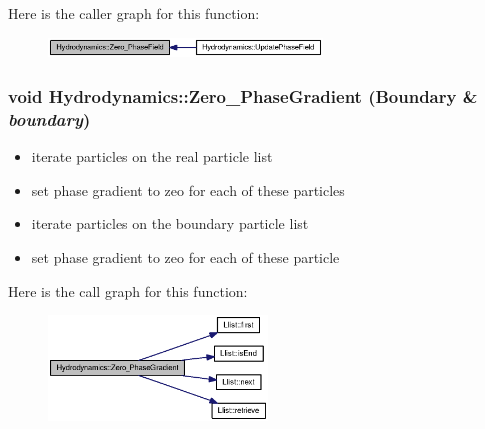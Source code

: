 Here is the caller graph for this function:\nopagebreak
\begin{figure}[H]
\begin{center}
\leavevmode
\includegraphics[width=206pt]{classHydrodynamics_dedab91b9a62eb7e26931cbbe73f79cc_icgraph}
\end{center}
\end{figure}
\hypertarget{classHydrodynamics_3c9019f19ccac5370b7b0ccda343b5d2}{
\subsubsection[{Zero\_\-PhaseGradient}]{\setlength{\rightskip}{0pt plus 5cm}void Hydrodynamics::Zero\_\-PhaseGradient ({\bf Boundary} \& {\em boundary})}}
\label{classHydrodynamics_3c9019f19ccac5370b7b0ccda343b5d2}




\begin{itemize}
\item iterate particles on the real particle list\end{itemize}


\begin{itemize}
\item set phase gradient to zeo for each of these particles\end{itemize}


\begin{itemize}
\item iterate particles on the boundary particle list\end{itemize}


\begin{itemize}
\item set phase gradient to zeo for each of these particle \end{itemize}


Here is the call graph for this function:\nopagebreak
\begin{figure}[H]
\begin{center}
\leavevmode
\includegraphics[width=165pt]{classHydrodynamics_3c9019f19ccac5370b7b0ccda343b5d2_cgraph}
\end{center}
\end{figure}


